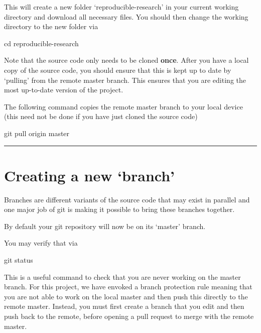 \documentclass[]{book}
\newenvironment{Shaded}{\begin{snugshade}}{\end{snugshade}}
\newcommand{\FunctionTok}[1]{\textcolor[rgb]{0.00,0.00,0.00}{#1}}
\newcommand{\BuiltInTok}[1]{#1}
\newcommand{\NormalTok}[1]{#1}
\begin{document}
This will create a new folder `reproducible-research' in your current
working directory and download all necessary files. You should then
change the working directory to the new folder via

\begin{Shaded}
\begin{Highlighting}[]
\BuiltInTok{cd}\NormalTok{ reproducible-research}
\end{Highlighting}
\end{Shaded}

Note that the source code only needs to be cloned \textbf{once}. After
you have a local copy of the source code, you should ensure that this is
kept up to date by `pulling' from the remote master branch. This ensures
that you are editing the most up-to-date version of the project.

The following command copies the remote master branch to your local
device (this need not be done if you have just cloned the source code)

\begin{Shaded}
\begin{Highlighting}[]
\FunctionTok{git}\NormalTok{ pull origin master}
\end{Highlighting}
\end{Shaded}

\begin{center}\rule{0.5\linewidth}{\linethickness}\end{center}

\section{\texorpdfstring{Creating a new
`branch'}{Creating a new branch}}\label{creating-a-new-branch}

Branches are different variants of the source code that may exist in
parallel and one major job of git is making it possible to bring these
branches together.

By default your git repository will now be on its `master' branch.

You may verify that via

\begin{Shaded}
\begin{Highlighting}[]
\FunctionTok{git}\NormalTok{ status}
\end{Highlighting}
\end{Shaded}

This is a useful command to check that you are never working on the
master branch. For this project, we have envoked a branch protection
rule meaning that you are not able to work on the local master and then
push this directly to the remote master. Instead, you must first create
a branch that you edit and then push back to the remote, before opening
a pull request to merge with the remote master.
\end{document}
